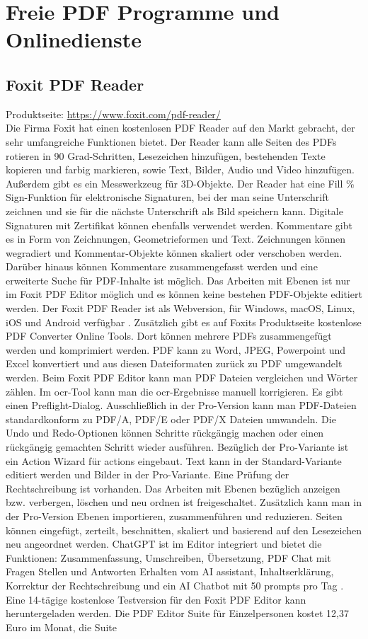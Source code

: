 \section{Freie PDF Programme und Onlinedienste}


\subsection{Foxit PDF Reader}
Produktseite: \url{https://www.foxit.com/pdf-reader/} \\
Die Firma Foxit hat einen kostenlosen PDF Reader auf den Markt gebracht, der sehr umfangreiche Funktionen bietet. Der Reader kann alle Seiten des PDFs rotieren in 90 Grad-Schritten, Lesezeichen hinzufügen, bestehenden Texte kopieren und farbig markieren, sowie Text, Bilder, Audio und Video hinzufügen. Außerdem gibt es ein Messwerkzeug für 3D-Objekte. Der Reader hat eine Fill \% Sign-Funktion für elektronische Signaturen, bei der man seine Unterschrift zeichnen und sie für die nächste Unterschrift als Bild speichern kann. Digitale Signaturen mit Zertifikat können ebenfalls verwendet werden. Kommentare gibt es in Form von Zeichnungen, Geometrieformen und Text. Zeichnungen können wegradiert und Kommentar-Objekte können skaliert oder verschoben werden. Darüber hinaus können Kommentare zusammengefasst werden und eine erweiterte Suche für PDF-Inhalte ist möglich. Das Arbeiten mit Ebenen ist nur im Foxit PDF Editor möglich und es können keine bestehen PDF-Objekte editiert werden. Der Foxit PDF Reader ist als Webversion, für Windows, macOS, Linux, iOS und Android verfügbar \cite{foxit-reader}. Zusätzlich gibt es auf Foxits Produktseite kostenlose PDF Converter Online Tools. Dort können mehrere PDFs zusammengefügt werden und komprimiert werden. PDF kann zu Word, JPEG, Powerpoint und Excel konvertiert und aus diesen Dateiformaten zurück zu PDF umgewandelt werden. Beim Foxit PDF Editor kann man PDF Dateien vergleichen und Wörter zählen. Im \gls{ocr}-Tool kann man die \gls{ocr}-Ergebnisse manuell korrigieren. Es gibt einen Preflight-Dialog. Ausschließlich in der Pro-Version kann man PDF-Dateien standardkonform zu PDF/A, PDF/E oder PDF/X Dateien umwandeln. Die Undo und Redo-Optionen können Schritte rückgängig machen oder einen rückgängig gemachten Schritt wieder ausführen. Bezüglich der Pro-Variante ist ein Action Wizard für actions eingebaut. Text kann in der Standard-Variante editiert werden und Bilder in der Pro-Variante. Eine Prüfung der Rechtschreibung ist vorhanden. Das Arbeiten mit Ebenen bezüglich anzeigen bzw. verbergen, löschen und neu ordnen ist freigeschaltet. Zusätzlich kann man in der Pro-Version Ebenen importieren, zusammenführen und reduzieren. Seiten können eingefügt, zerteilt, beschnitten, skaliert und basierend auf den Lesezeichen neu angeordnet werden. ChatGPT ist im Editor integriert und bietet die Funktionen: Zusammenfassung, Umschreiben, Übersetzung, PDF Chat mit Fragen Stellen und Antworten Erhalten vom AI assistant, Inhaltserklärung, Korrektur der Rechtschreibung und ein AI Chatbot mit 50 prompts pro Tag \cite{foxit-um}. Eine 14-tägige kostenlose Testversion für den Foxit PDF Editor kann heruntergeladen werden. Die PDF Editor Suite für Einzelpersonen kostet 12,37 Euro im Monat, die Suite 